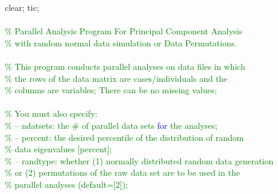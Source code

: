 \hspace{1mm}clear; tic; \\ 
\hspace{1mm} \\ 
\hspace{1mm}\textcolor{green}{\% Parallel Analysis Program For Principal Component Analysis }\\ 
\hspace{1mm}\textcolor{green}{\%   with random normal data simulation or Data Permutations. }\\ 
\hspace{1mm} \\ 
\hspace{1mm}\textcolor{green}{\%  This program conducts parallel analyses on data files in which }\\ 
\hspace{1mm}\textcolor{green}{\%  the rows of the data matrix are cases/individuals and the }\\ 
\hspace{1mm}\textcolor{green}{\%  columns are variables; There can be no missing values; }\\ 
\hspace{1mm} \\ 
\hspace{1mm}\textcolor{green}{\%  You must also specify: }\\ 
\hspace{1mm}\textcolor{green}{\%   -- ndatsets: the # of parallel data sets \textcolor{blue}{for} the analyses; }\\ 
\hspace{1mm}\indent \textcolor{green}{\%   -- percent: the desired percentile of the distribution of random }\\ 
\hspace{1mm}\indent \textcolor{green}{\%      data eigenvalues [percent]; }\\ 
\hspace{1mm}\indent \textcolor{green}{\%   -- randtype: whether (1) normally distributed random data generation  }\\ 
\hspace{1mm}\indent \textcolor{green}{\%      or (2) permutations of the raw data set are to be used in the }\\ 
\hspace{1mm}\indent \textcolor{green}{\%      parallel analyses (default=[2]); }\\ 
\hspace{1mm}\indent  \\ 
